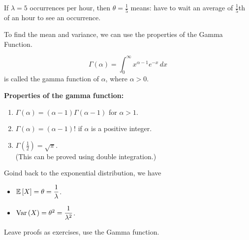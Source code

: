 \begin{example}
    If $\lambda = 5$ occurrences per hour, then $\theta = \frac{1}{5}$ means: have to wait an average of $\frac{1}{5}$th of an hour to see an occurrence. 
\end{example}

\vspace{2mm}

To find the mean and variance, we can use the properties of the Gamma Function. 
\begin{definition}
    \[\Gamma{(\alpha)} = \int_{0}^{\infty} x^{\alpha - 1}e^{-x} \, dx\]
    is called the gamma function of $\alpha$, where $\alpha > 0$.
\end{definition}

\textbf{Properties of the gamma function:}
\begin{enumerate}
    \item $\Gamma{(\alpha)} = (\alpha - 1)\Gamma{(\alpha - 1)}$ for $\alpha > 1$.
    \item $\Gamma{(\alpha)} = (\alpha - 1)!$ if $\alpha$ is a positive integer.
    \item $\Gamma{(\frac{1}{2})} = \sqrt{\pi}$. \\
    (This can be proved using double integration.) \\
\end{enumerate}

Goind back to the exponential distribution, we have
\begin{itemize}
    \item $\mathbb{E}\left[{X}\right] = \theta = \displaystyle \frac{1}{\lambda}$.
    \item $\operatorname{Var}\left({X}\right) = \theta^2 = \displaystyle \frac{1}{\lambda^2}$.
\end{itemize}

\begin{remark}
    Leave proofs as exercises, use the Gamma function. \\ \phantom{} \\
\end{remark}

